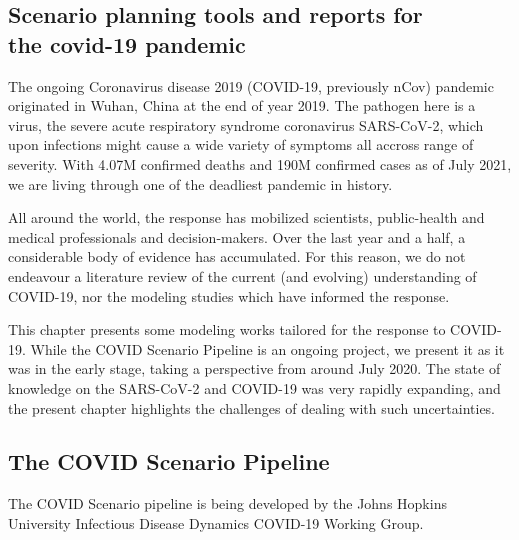 \begin{fullwidth}
\chapter[Scenario planning tools and reports for the covid-19 pandemic]{Scenario planning tools and reports for \\the covid-19 pandemic}
\label{sec:covid-pipeline-reports}
  \end{fullwidth}
The ongoing Coronavirus disease 2019 (COVID-19, previously nCov) pandemic originated in Wuhan, China at the end of year 2019. The pathogen here is a virus, the severe acute respiratory syndrome coronavirus SARS-CoV-2, which upon infections might cause a wide variety of symptoms all accross range of severity. With 4.07\textsc{M} confirmed deaths and 190\textsc{M} confirmed cases as of July 2021, we are living through one of the deadliest pandemic in history.

 All around the world, the response has mobilized scientists, public-health and medical professionals and decision-makers. Over the last year and a half, a considerable body of evidence has accumulated. For this reason, we do not endeavour a literature review of the current (and evolving) understanding of COVID-19, nor the modeling studies which have informed the response. 

 This chapter presents some modeling works tailored for the response to COVID-19. While the COVID Scenario Pipeline is an ongoing project, we present it as it was in the early stage, taking a perspective from around July 2020. The state of knowledge on the SARS-CoV-2 and COVID-19 was very rapidly expanding, and the present chapter highlights the challenges of dealing with such uncertainties. 

\vspace{\baselineskip}
\section{The COVID Scenario Pipeline}

The COVID Scenario pipeline is being developed by the Johns Hopkins University Infectious Disease Dynamics COVID-19 Working Group. 

